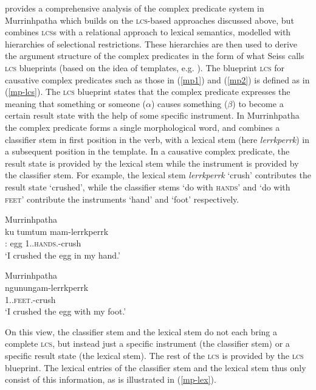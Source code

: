 \documentclass[output=paper,hidelinks]{langscibook}
\begin{document}
\citet{Seiss2013} provides a comprehensive analysis of the complex predicate system in Murrinhpatha which builds on the \textsc{lcs}-based approaches discussed above, but combines \textsc{lcs}s with a relational approach to lexical semantics, modelled with hierarchies of selectional restrictions. These hierarchies are then used to derive the argument structure of the complex predicates in the form of what Seiss calls \textsc{lcs} blueprints (based on the idea of templates, e.g. \citealt{dalrymple2004linguistic}).  The blueprint \textsc{lcs} for causative complex predicates such as those in (\ref{mp1}) and (\ref{mp2}) is defined as in (\ref{mp-lcs}). The \textsc{lcs} blueprint states that the complex predicate expresses the meaning that something or someone ($\alpha$) causes something ($\beta$) to become a certain result state with the help of some specific instrument. In Murrinhpatha the complex predicate forms a single morphological word, and combines a classifier stem in first position in the verb, with a lexical stem (here {\it lerrkperrk}) in a subsequent position in the template. In a causative complex predicate, the result state is provided by the lexical stem while the instrument is provided by the classifier stem. For example, the lexical stem {\it lerrkperrk} `crush' contributes the result state `crushed', while the classifier stems `do with \textsc{hands}' and `do with \textsc{feet}' contribute the instruments `hand' and `foot' respectively. 

\ea
\label{mp1} Murrinhpatha\\
\gll ku tumtum mam-lerrkperrk\\
{\CLF:\ANIM} {egg} {1\SG.\SBJ.\textsc{hands}.\NFUT-crush}\\
\glt `I crushed the egg in my hand.' \citep[127]{Seiss2013}
\z

\ea
\label{mp2} Murrinhpatha\\
\gll ngunungam-lerrkperrk\\
{1\SG.\SBJ.\textsc{feet}.\NFUT-crush}\\
\glt `I crushed the egg with my foot.' \citep[127]{Seiss2013}
\z


On this view, the classifier stem and the lexical stem do not each bring a complete \textsc{lcs}, but instead just a specific instrument (the classifier stem) or a specific result state (the lexical stem). The rest of the \textsc{lcs} is provided by the \textsc{lcs} blueprint.  The lexical entries of the classifier stem and the lexical stem thus only consist of this information, as is illustrated in (\ref{mp-lex}).
\end{document}
